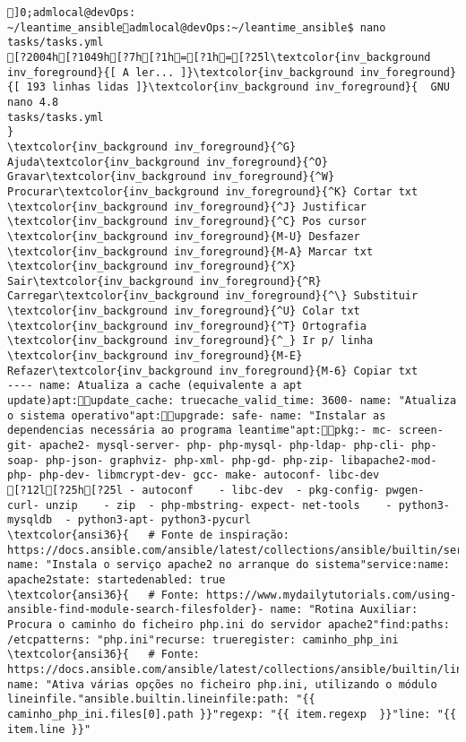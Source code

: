 \documentclass{scrartcl}
\title{}
\begin{document}
\begin{Verbatim}
]0;admlocal@devOps: ~/leantime_ansibleadmlocal@devOps:~/leantime_ansible$ nano tasks/tasks.yml 
[?2004h[?1049h[?7h[?1h=[?1h=[?25l\textcolor{inv_background inv_foreground}{[ A ler... ]}\textcolor{inv_background inv_foreground}{[ 193 linhas lidas ]}\textcolor{inv_background inv_foreground}{  GNU nano 4.8                                                tasks/tasks.yml                                                             }
\textcolor{inv_background inv_foreground}{^G} Ajuda\textcolor{inv_background inv_foreground}{^O} Gravar\textcolor{inv_background inv_foreground}{^W} Procurar\textcolor{inv_background inv_foreground}{^K} Cortar txt    \textcolor{inv_background inv_foreground}{^J} Justificar    \textcolor{inv_background inv_foreground}{^C} Pos cursor    \textcolor{inv_background inv_foreground}{M-U} Desfazer     \textcolor{inv_background inv_foreground}{M-A} Marcar txt
\textcolor{inv_background inv_foreground}{^X} Sair\textcolor{inv_background inv_foreground}{^R} Carregar\textcolor{inv_background inv_foreground}{^\} Substituir    \textcolor{inv_background inv_foreground}{^U} Colar txt     \textcolor{inv_background inv_foreground}{^T} Ortografia    \textcolor{inv_background inv_foreground}{^_} Ir p/ linha   \textcolor{inv_background inv_foreground}{M-E} Refazer\textcolor{inv_background inv_foreground}{M-6} Copiar txt
---- name: Atualiza a cache (equivalente a apt update)apt:update_cache: truecache_valid_time: 3600- name: "Atualiza o sistema operativo"apt:upgrade: safe- name: "Instalar as dependencias necessária ao programa leantime"apt:pkg:- mc- screen- git- apache2- mysql-server- php- php-mysql- php-ldap- php-cli- php-soap- php-json- graphviz- php-xml- php-gd- php-zip- libapache2-mod-php- php-dev- libmcrypt-dev- gcc- make- autoconf- libc-dev
[?12l[?25h[?25l - autoconf    - libc-dev  - pkg-config- pwgen- curl- unzip    - zip  - php-mbstring- expect- net-tools    - python3-mysqldb  - python3-apt- python3-pycurl
\textcolor{ansi36}{   # Fonte de inspiração: https://docs.ansible.com/ansible/latest/collections/ansible/builtin/service_module.html}- name: "Instala o serviço apache2 no arranque do sistema"service:name: apache2state: startedenabled: true
\textcolor{ansi36}{   # Fonte: https://www.mydailytutorials.com/using-ansible-find-module-search-filesfolder}- name: "Rotina Auxiliar: Procura o caminho do ficheiro php.ini do servidor apache2"find:paths: /etcpatterns: "php.ini"recurse: trueregister: caminho_php_ini
\textcolor{ansi36}{   # Fonte: https://docs.ansible.com/ansible/latest/collections/ansible/builtin/lineinfile_module.html}- name: "Ativa várias opções no ficheiro php.ini, utilizando o módulo lineinfile."ansible.builtin.lineinfile:path: "{{ caminho_php_ini.files[0].path }}"regexp: "{{ item.regexp  }}"line: "{{ item.line }}"

\end{Verbatim}
\end{document}
